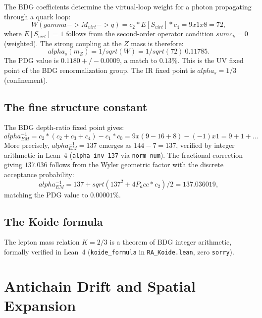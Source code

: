 \documentclass[11pt]{article}
\def\alpha{alpha}%
\def\gamma{gamma}%
\def\mathrm#1{#1}%
\def\mathbb#1{#1}%
\def\sqrt#1{sqrt(#1)}%
\def\frac#1#2{#1/#2}%
\def\cdot{*}%
\def\times{x}%
\def\approx{~}%
\def\to{->}%
\def\sum{sum}%
\def\ldots{...}%
\def\pm{+/-}%
\def\Pacc{P_acc}%
\newcommand{\Pacc}{P_{\mathrm{acc}}}
\begin{document}
The BDG coefficients determine the virtual-loop weight for a photon propagating through a quark loop:
\begin{equation}
W(\gamma\to M_{\mathrm{virt}}\to q) = c_2 \cdot \mathbb{E}[S_{\mathrm{virt}}] \cdot c_4 = 9\times 1\times 8=72,
\end{equation}
where $\mathbb{E}[S_{\mathrm{virt}}]=1$ follows from the second-order operator condition $\sum c_k=0$ (weighted). The strong coupling at the $Z$ mass is therefore:
\begin{equation}
\alpha_s(m_Z) = \frac{1}{\sqrt{W}} = \frac{1}{\sqrt{72}} \approx 0.11785.
\end{equation}
The PDG value is $0.1180\pm 0.0009$, a match to $0.13\%$. This is the UV fixed point of the BDG renormalization group. The IR fixed point is $\alpha_s=1/3$ (confinement).

\subsection{The fine structure constant}

The BDG depth-ratio fixed point gives:
\begin{equation}
\alpha_{\mathrm{EM}}^{-1} = c_2\cdot(c_2+c_3+c_4) - c_1\cdot c_0 = 9\times(9-16+8)-(-1)\times 1 = 9+1+\ldots
\end{equation}
More precisely, $\alpha_{\mathrm{EM}}^{-1}=137$ emerges as $144-7=137$, verified by integer arithmetic in Lean~4 (\texttt{alpha\_inv\_137} via \texttt{norm\_num}). The fractional correction giving $137.036$ follows from the Wyler geometric factor with the discrete acceptance probability:
\begin{equation}
\alpha_{\mathrm{EM}}^{-1} = \frac{137+\sqrt{137^2+4\Pacc\cdot c_2}}{2} = 137.036019,
\end{equation}
matching the PDG value to $0.00001\%$.

\subsection{The Koide formula}

The lepton mass relation $K=2/3$ is a theorem of BDG integer arithmetic, formally verified in Lean~4 (\texttt{koide\_formula} in \texttt{RA\_Koide.lean}, zero \texttt{sorry}).

\section{Antichain Drift and Spatial Expansion}
\label{sec:drift}
\end{document}
